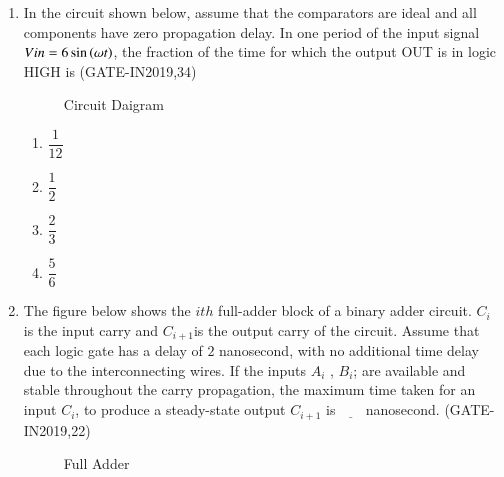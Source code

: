 \begin{enumerate}
\item In the circuit shown below, assume that the comparators are ideal and all components have zero propagation delay. In one period of the input signal $Vin=6\sin\left(\omega t\right)$, the fraction of the time for which the output OUT is in logic HIGH is 
		                 \hfill(GATE-IN2019,34)
\begin{figure}[H]
\centering
    
	    \caption{Circuit Daigram}
     \end{figure}
\begin{enumerate}
	\item $\dfrac{1}{12}$
	\item $\dfrac{1}{2}$
	\item $\dfrac{2}{3}$
	\item $\dfrac{5}{6}$
\end{enumerate}


\item The figure below shows the $ith$ full-adder block of a binary adder circuit. $C_i$ is the input carry and $C_{i+1}$is the output carry of the circuit. Assume that each logic gate has a delay of $2$ nanosecond, with no additional time delay due to the interconnecting wires. If the inputs $A_i$ , $B_i$; are available and stable throughout the carry propagation, the maximum time taken for an input $C_i$, to produce a steady-state output $C_{i+1}$ is $\underline{\hspace{18pt}}$ nanosecond.
	               \hfill(GATE-IN2019,22)
\begin{figure}[H] 
    \centering
	
	\caption{Full Adder}
\end{figure}

\end{enumerate}


